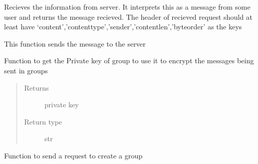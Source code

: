 \documentclass[letterpaper,10pt,english]{sphinxmanual}
\begin{document}
\begin{fulllineitems}

\begin{fulllineitems}
\label{\detokenize{Message:Message.Message._recvmsg}}
Recieves the information from server. It interprets this as a message from some user and returns the message recieved. The header of recieved request should at least have ‘content’,’content\sphinxhyphen{}type’,’sender’,’content\sphinxhyphen{}len’,’byteorder’ as the keys

\end{fulllineitems}


\begin{fulllineitems}
\label{\detokenize{Message:Message.Message._sendmsg}}
This function sends the message to the server

\end{fulllineitems}


\begin{fulllineitems}
\label{\detokenize{Message:Message.Message._create_group_key}}
Function to get the Private key of group to use it to encrypt the messages being sent in groups
\begin{quote}\begin{description}
\item[{Returns}] \leavevmode
private key

\item[{Return type}] \leavevmode
str

\end{description}\end{quote}

\end{fulllineitems}


\begin{fulllineitems}
\label{\detokenize{Message:Message.Message._create_grp}}
Function to send a request to create a group


\end{fulllineitems}
\end{fulllineitems}
\end{document}
